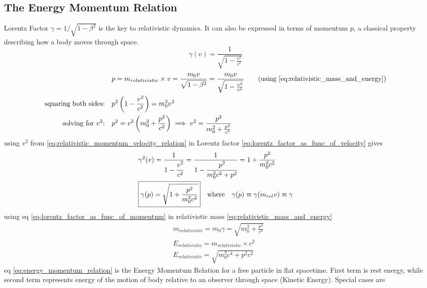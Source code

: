 \documentclass[11pt, a4paper]{article}
\begin{document}
\subsection{The Energy Momentum Relation}
Lorentz Factor $\gamma = 1/\sqrt{1 - \beta^{2}}$ is  the key to relativistic dynamics. It can also be expressed in terms of momentum $p$, a classical property describing how a body moves through space.
\begin{equation}\label{eq:lorentz_factor_as_func_of_velocity}
	\gamma(v) = \frac{1}{\sqrt{1 - \frac{v^{2}}{c^{2}}}}
\end{equation}
\begin{align}
	& p = m_{relativistic} \times v = \frac{m_{0}v}{\sqrt{1 - \beta^{2}}} = \frac{m_{0}v}{\sqrt{1 - \frac{v^{2}}{c^{2}}}} \nonumber \tag{using \eqref{eq:relativistic_mass_and_energy}} \\
	\text{squaring both sides:} \quad & p^{2}\left(1 - \frac{v^{2}}{c^{2}} \right) = m_{0}^{2}v^{2} \nonumber \\
	\text{solving for $v^{2}$:} \quad & p^{2} = v^{2} \left(m_{0}^{2} + \frac{p^{2}}{c^{2}}\right) \implies v^{2} = \frac{p^{2}}{m_{0}^{2} + \frac{p^{2}}{c^{2}}} \label{eq:relativistic_momentum_velocity_relation}
\end{align}
using $v^{2}$ from \eqref{eq:relativistic_momentum_velocity_relation} in Lorentz factor \eqref{eq:lorentz_factor_as_func_of_velocity} gives
\begin{align}
	& \gamma^{2}(v) = \frac{1}{1 - \cfrac{v^{2}}{c^{2}}} = \frac{1}{1 - \cfrac{p^{2}}{m_{0}^{2}c^{2} + p^{2}}} = 1 + \frac{p^{2}}{m_{0}^{2}c^{2}} \nonumber  \\
	& \boxed{\gamma(p) = \sqrt{1 + \frac{p^{2}}{m_{0}^{2}c^{2}}}} \quad \text{where} \quad \gamma(p) \equiv \gamma(m_{rel}v) \equiv \gamma \label{eq:lorentz_factor_as_func_of_momentum}
\end{align}
using eq \eqref{eq:lorentz_factor_as_func_of_momentum} in relativistic mass \eqref{eq:relativistic_mass_and_energy}
\begin{align}
	& m_{relativistic} = m_{0} \gamma = \sqrt{m_{0}^{2} + \frac{p^{2}}{c^{2}}} \nonumber \\
	& E_{relativistic} = m_{relativistic} \times c^{2}\nonumber \\
	& \boxed{E_{relativistic} = \sqrt{m_{0}^{2}c^{4} + p^{2}c^{2}}} \label{eq:energy_momentum_relation}
\end{align}
eq \eqref{eq:energy_momentum_relation} is the Energy Momentum Relation for a free particle in flat spacetime. First term is rest energy, while second term represents energy of the motion of body relative to an observer through space (Kinetic Energy). Special cases are
\end{document}
